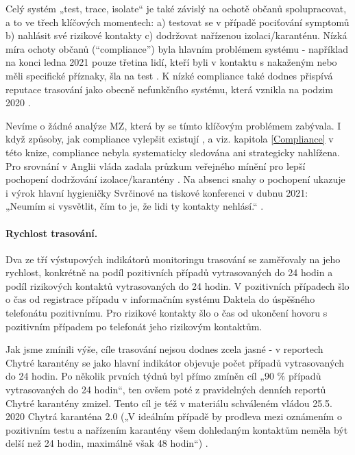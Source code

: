 Celý systém „test, trace, isolate“ je také závislý na ochotě občanů spolupracovat, a to ve třech klíčových momentech: a) testovat se v případě pociťování symptomů b) nahlásit své rizikové kontakty c) dodržovat nařízenou izolaci/karanténu. Nízká míra ochoty občanů (“compliance”) byla hlavním problémem systému - například na konci ledna 2021 pouze třetina lidí, kteří byli v kontaktu s nakaženým nebo měli specifické příznaky, šla na test \cite{tr_prokop01}. K nízké compliance také dodnes přispívá reputace trasování jako obecně nefunkčního systému, která vznikla na podzim 2020 \cite{tr_bisop01}.

Nevíme o žádné analýze MZ, která by se tímto klíčovým problémem zabývala. I když způsoby, jak compliance vylepšit existují \cite{tr_bisop02}, a viz. kapitola \ref{Compliance} v této knize, compliance nebyla systematicky sledována ani strategicky nahlížena. Pro srovnání v Anglii vláda zadala průzkum veřejného mínění pro lepší pochopení dodržování izolace/karantény \cite{tr_ofns}. Na absenci snahy o pochopení ukazuje i výrok hlavní hygieničky Svrčinové na tiskové konferenci v dubnu 2021: „Neumím si vysvětlit, čím to je, že lidi ty kontakty nehlásí.“ \cite{tr_idnes01}.


\paragraph{Rychlost trasování.} Dva ze tří výstupových indikátorů monitoringu trasování se zaměřovaly na jeho rychlost, konkrétně na podíl pozitivních případů vytrasovaných do 24 hodin a podíl rizikových kontaktů vytrasovaných do 24 hodin. V pozitivních případech šlo o čas od registrace případu v informačním systému Daktela do úspěšného telefonátu pozitivnímu. Pro rizikové kontakty šlo o čas od ukončení hovoru s pozitivním případem po telefonát jeho rizikovým kontaktům.

Jak jsme zmínili výše, cíle trasování nejsou dodnes zcela jasné - v reportech Chytré karantény se jako hlavní indikátor objevuje počet případů vytrasovaných do 24 hodin. Po několik prvních týdnů byl přímo zmíněn cíl „90 \% případů vytrasovaných do 24 hodin“, ten ovšem poté z pravidelných denních reportů Chytré karantény zmizel. Tento cíl je též v materiálu schváleném vládou 25.5. 2020 Chytrá karanténa 2.0 („V ideálním případě by prodleva mezi oznámením o pozitivním testu a nařízením karantény všem dohledaným kontaktům neměla být delší než 24 hodin, maximálně však 48 hodin“) \cite{tr_vlada01}.


